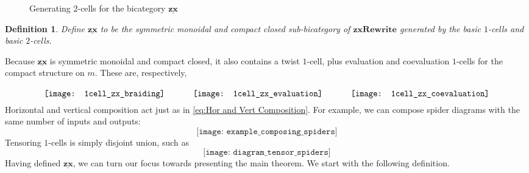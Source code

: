 \documentclass[]{amsart}
\theoremstyle{defn}
\newtheorem{defn}[thm]{Definition}
\begin{document}
\begin{figure}[h]
	\caption{Generating $2$-cells for the bicategory $\underline{\mathbf{zx}}$}
	\label{fig:ZX 2cells generators}
\end{figure}

\begin{defn}
	\label{def:zx bicat}
	Define $\underline{\mathbf{zx}}$ to be the symmetric monoidal and compact closed sub-bicategory of $\mathbf{zxRewrite}$ generated by the basic $1$-cells and basic $2$-cells.
\end{defn}

Because $\underline{\mathbf{zx}}$ is symmetric monoidal and compact closed, it also contains a twist $1$-cell, plus evaluation and coevaluation $1$-cells for the compact structure on $m$.  These are, respectively, 
\begin{equation}
\label{diag:TwistCompact 1cells}
\raisebox{-0.8\height}{
	\texttt{[image: 1cell\_zx\_braiding]}
	\quad \quad \quad
	\texttt{[image: 1cell\_zx\_evaluation]}
	\quad \quad \quad
	\texttt{[image: 1cell\_zx\_coevaluation]}
}
\end{equation}
Horizontal and vertical composition act just as in \eqref{eq:Hor and Vert Composition}. For example, we can compose spider diagrams with the same number of inputs and outputs:
\[
\texttt{[image: example\_composing\_spiders]}
\]
Tensoring $1$-cells is simply disjoint union, such as
\[
\texttt{[image: diagram\_tensor\_spiders]}
\]
Having defined $\underline{\mathbf{zx}}$, we can turn our focus towards presenting the main theorem. We start with the following definition.
\end{document}
